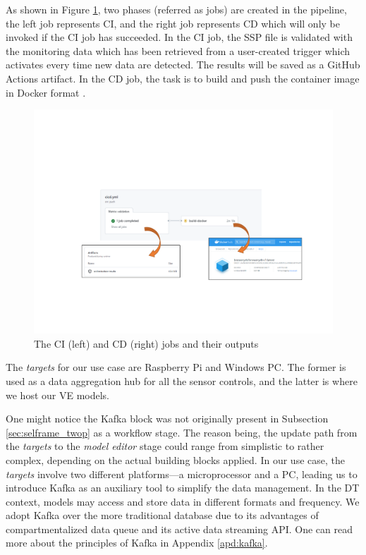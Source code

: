 As shown in Figure \ref{fig:s1_twop_cicd}, two phases (referred as jobs) are created in the pipeline, the left job represents CI, and the right job represents CD which will only be invoked if the CI job has succeeded. In the CI job, the SSP file is validated with the monitoring data which has been retrieved from a user-created trigger which activates every time new data are detected. The results will be saved as a GitHub Actions artifact. In the CD job, the task is to build and push the container image in Docker format \cite{Docker}.

\begin{figure}[hbt!]
  \centering
  \includegraphics[scale=0.65]{figures/s1_twop_cicd.pdf}
  \caption{The CI (left) and CD (right) jobs and their outputs}
  \label{fig:s1_twop_cicd}
\end{figure}

The \textit{targets} for our use case are Raspberry Pi and Windows PC. The former is used as a data aggregation hub for all the sensor controls, and the latter is where we host our VE models.

One might notice the Kafka \cite{Kafka} block was not originally present in Subsection \ref{sec:selframe_twop} as a workflow stage. The reason being, the update path from the \textit{targets} to the \textit{model editor} stage could range from simplistic to rather complex, depending on the actual building blocks applied. In our use case, the \textit{targets} involve two different platforms---a microprocessor and a PC, leading us to introduce Kafka as an auxiliary tool to simplify the data management. In the DT context, models may access and store data in different formats and frequency. We adopt Kafka over the more traditional database due to its advantages of compartmentalized data queue and its active data streaming API. One can read more about the principles of Kafka in Appendix \ref{apd:kafka}.

